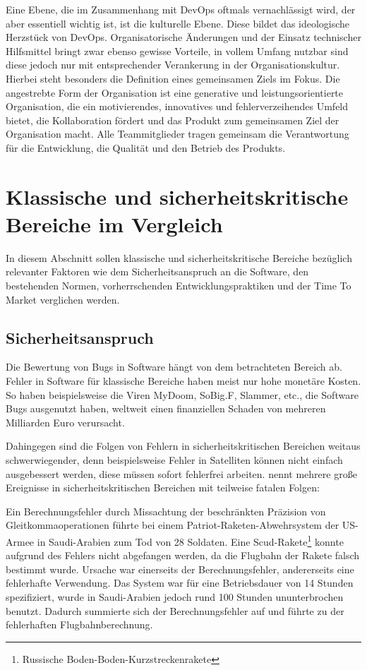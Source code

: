 Eine Ebene, die im Zusammenhang mit DevOps oftmals vernachlässigt wird, der aber essentiell wichtig ist, ist die kulturelle Ebene.
Diese bildet das ideologische Herzstück von DevOps. 
Organisatorische Änderungen und der Einsatz technischer Hilfsmittel bringt zwar ebenso gewisse Vorteile, in vollem Umfang nutzbar sind diese jedoch nur mit entsprechender Verankerung in der Organisationskultur. 
Hierbei steht besonders die Definition eines gemeinsamen Ziels im Fokus. Die angestrebte Form der Organisation ist eine generative und leistungsorientierte Organisation, die ein motivierendes, innovatives und fehlerverzeihendes Umfeld bietet, die Kollaboration fördert und das Produkt zum gemeinsamen Ziel der Organisation macht. 
Alle Teammitglieder tragen gemeinsam die Verantwortung für die Entwicklung, die Qualität und den Betrieb des Produkts.

\section{Klassische und sicherheitskritische Bereiche im Vergleich} \label{sec:bereiche} %

In diesem Abschnitt sollen klassische und sicherheitskritische Bereiche bezüglich relevanter Faktoren wie dem Sicherheitsanspruch an die Software, den bestehenden Normen, vorherrschenden Entwicklungspraktiken und der Time To Market verglichen werden.

\subsection{Sicherheitsanspruch} %

Die Bewertung von Bugs in Software hängt von dem betrachteten Bereich ab.
Fehler in Software für klassische Bereiche haben meist nur hohe monetäre Kosten.
So haben beispielsweise die Viren MyDoom, SoBig.F, Slammer, etc., die Software Bugs ausgenutzt haben, weltweit einen finanziellen Schaden von mehreren Milliarden Euro verursacht. \parencite[Vgl.][]{ComputerEconomics2004aa}

Dahingegen sind die Folgen von Fehlern in sicherheitskritischen Bereichen weitaus schwerwiegender, denn beispielsweise Fehler in Satelliten können nicht einfach ausgebessert werden, diese müssen sofort fehlerfrei arbeiten.
\parencite[][S. 87 - 89]{Zhivich:2009aa} nennt mehrere große Ereignisse in sicherheitskritischen Bereichen mit teilweise fatalen Folgen:

Ein Berechnungsfehler durch Missachtung der beschränkten Präzision von Gleitkommaoperationen führte bei einem Patriot-Raketen-Abwehrsystem der US-Armee in Saudi-Arabien zum Tod von 28 Soldaten.
Eine Scud-Rakete\footnote{Russische Boden-Boden-Kurzstreckenrakete} konnte aufgrund des Fehlers nicht abgefangen werden, da die Flugbahn der Rakete falsch bestimmt wurde.
Ursache war einerseits der Berechnungsfehler, andererseits eine fehlerhafte Verwendung.
Das System war für eine Betriebsdauer von 14 Stunden spezifiziert, wurde in Saudi-Arabien jedoch rund 100 Stunden ununterbrochen benutzt.
Dadurch summierte sich der Berechnungsfehler auf und führte zu der fehlerhaften Flugbahnberechnung.

